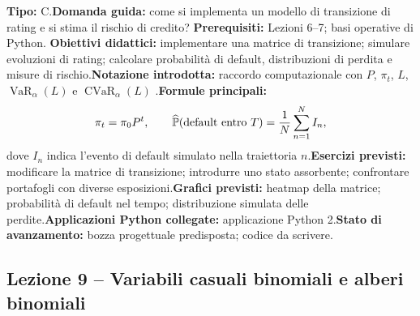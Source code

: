 \documentclass[12pt,a4paper]{article}%
\begin{document}
\textbf{Tipo:} C.\newline\textbf{Domanda guida:} come si implementa un modello
di transizione di rating e si stima il rischio di credito?\newline%
\textbf{Prerequisiti:} Lezioni 6--7; basi operative di Python.\newline%
\textbf{Obiettivi didattici:} implementare una matrice di transizione;
simulare evoluzioni di rating; calcolare probabilit\`{a} di default,
distribuzioni di perdita e misure di rischio.\newline\textbf{Notazione
introdotta:} raccordo computazionale con $P$, $\pi_{t}$, $L$,
$\operatorname{VaR}_{\alpha}(L)$ e $\operatorname{CVaR}_{\alpha}(L)$%
.\newline\textbf{Formule principali:}
\[
\pi_{t}=\pi_{0}P^{t}, \qquad\widehat{\mathbb{P}}(\hbox{default entro }T)=\frac
{1}{N}\sum_{n=1}^{N} I_{n},
\]
dove $I_{n}$ indica l'evento di default simulato nella traiettoria
$n$.\newline\textbf{Esercizi previsti:} modificare la matrice di transizione;
introdurre uno stato assorbente; confrontare portafogli con diverse
esposizioni.\newline\textbf{Grafici previsti:} heatmap della matrice;
probabilit\`{a} di default nel tempo; distribuzione simulata delle
perdite.\newline\textbf{Applicazioni Python collegate:} applicazione Python
2.\newline\textbf{Stato di avanzamento:} bozza progettuale predisposta; codice
da scrivere.

\subsection{Lezione 9 -- Variabili casuali binomiali e alberi binomiali}
\end{document}
